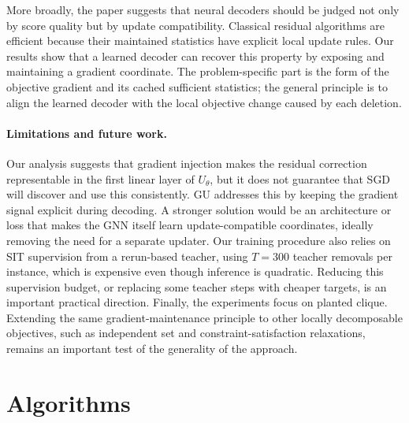 \documentclass[11pt]{article}
\theoremstyle{plain}
\theoremstyle{remark}
\theoremstyle{plain}
\begin{document}
More broadly, the paper suggests that neural decoders should be judged not only
by score quality but by update compatibility. Classical residual algorithms are
efficient because their maintained statistics have explicit local update rules.
Our results show that a learned decoder can recover this property by exposing
and maintaining a gradient coordinate. The problem-specific part is the form of
the objective gradient and its cached sufficient statistics; the general principle
is to align the learned decoder with the local objective change caused by each
deletion.

\paragraph{Limitations and future work.}
Our analysis suggests that gradient injection makes the residual correction
representable in the first linear layer of $U_\theta$, but it does not guarantee
that SGD will discover and use this consistently. GU addresses this by keeping
the gradient signal explicit during decoding. A stronger solution would be an
architecture or loss that makes the GNN itself learn update-compatible coordinates,
ideally removing the need for a separate updater. Our training procedure also relies
on SIT supervision from a rerun-based teacher, using $T=300$ teacher removals per
instance, which is expensive even though inference is quadratic. Reducing this
supervision budget, or replacing some teacher steps with cheaper targets, is an
important practical direction. Finally, the experiments focus on planted clique.
Extending the same gradient-maintenance principle to other locally decomposable
objectives, such as independent set and constraint-satisfaction relaxations, remains
an important test of the generality of the approach.






\clearpage
\appendix
\section{Algorithms}
\label{app:algorithms}
\end{document}
